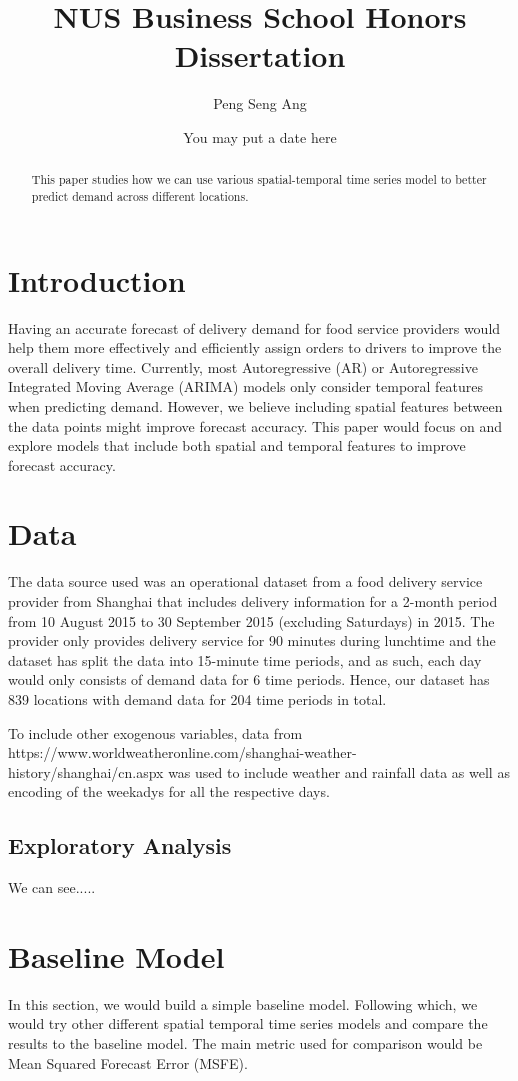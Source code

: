 \documentclass[10pt, letterpaper] {article}
\begin{document}
	\title{NUS Business School Honors Dissertation}
	\author{Peng Seng Ang}
	\date{You may put a date here}
	\maketitle
\begin{abstract}
This paper studies how we can use various spatial-temporal time series model to better predict demand across different locations. 
\end{abstract}
\section{Introduction}
Having an accurate forecast of delivery demand for food service providers would help them more effectively and efficiently assign orders to drivers to improve the overall delivery time. Currently, most Autoregressive (AR) or Autoregressive Integrated Moving Average (ARIMA) models only consider temporal features when predicting demand. However, we believe including spatial features between the data points might improve forecast accuracy. This paper would focus on and explore models that include both spatial and temporal features to improve forecast accuracy. 
\section{Data}
The data source used was an operational dataset from a food delivery service provider from Shanghai that includes delivery information for a 2-month period from 10 August 2015 to 30 September 2015 (excluding Saturdays) in 2015. The provider only provides delivery service for 90 minutes during lunchtime and the dataset has split the data into 15-minute time periods, and as such, each day would only consists of demand data for 6 time periods. Hence, our dataset has 839 locations with demand data for 204 time periods in total. 

To include other exogenous variables, data from https://www.worldweatheronline.com/shanghai-weather-history/shanghai/cn.aspx was used to include weather and rainfall data as well as encoding of the weekadys for all the respective days. 

\subsection{Exploratory Analysis}
We can see.....
\section{Baseline Model}
In this section, we would build a simple baseline model. Following which, we would try other different spatial temporal time series models and compare the results to the baseline model. The main metric used for comparison would be Mean Squared Forecast Error (MSFE). 
\end{document}
